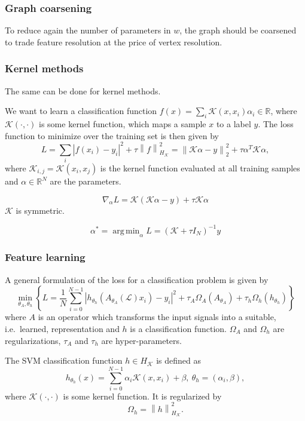 \documentclass{article}
\DeclareMathOperator*{\argmin}{arg\,min}
\renewcommand{\L}{\mathcal{L}}
\newcommand{\K}{\mathcal{K}}
\newcommand{\R}{\mathbb{R}}
\newcommand{\norm}[1]{\left\| #1 \right\|}
\begin{document}
\subsubsection{Graph coarsening}\label{graph-coarsening-1}

To reduce again the number of parameters in \(w\), the graph should be
coarsened to trade feature resolution at the price of vertex resolution.

\subsubsection{Kernel methods}\label{kernel-methods}

The same can be done for kernel methods.

We want to learn a classification function
\(f(x) = \sum_i \K(x,x_i) \alpha_i \in \R\), where \(\K(\cdot,\cdot)\)
is some kernel function, which maps a sample \(x\) to a label \(y\). The
loss function to minimize over the training set is then given by
\[ L = \sum_i |f(x_i) - y_i|^2 + \tau \norm{f}_{H_\K}^2 =
\norm{ \K \alpha - y }_2^2 + \tau \alpha^T \K \alpha, \] where
\(\K_{i,j} = \K(x_i, x_j)\) is the kernel function evaluated at all
training samples and \(\alpha \in \R^N\) are the parameters.

\[ \nabla_\alpha L = \K (\K \alpha - y) + \tau \K \alpha \] \(\K\) is
symmetric.

\[ \alpha^* = \argmin_\alpha L = (\K + \tau I_N)^{-1} y \]

\subsubsection{Feature learning}\label{feature-learning-1}

A general formulation of the loss for a classification problem is given
by \[ \min_{\theta_A, \theta_h} \left\{ L = \frac{1}{N} \sum_{i=0}^{N-1}
\left| h_{\theta_h}(A_{\theta_A}(\L) x_i) - y_i \right|^2 +
\tau_A \Omega_A(A_{\theta_A}) + \tau_h \Omega_h(h_{\theta_h}) \right\} \]
where \(A\) is an operator which transforms the input signals into a
suitable, i.e.~learned, representation and \(h\) is a classification
function. \(\Omega_A\) and \(\Omega_h\) are regularizations, \(\tau_A\)
and \(\tau_h\) are hyper-parameters.

The SVM classification function \(h \in H_\K\) is defined as
\[ h_{\theta_h}(x) = \sum_{i=0}^{N-1} \alpha_i \K(x, x_i) + \beta,
\ \theta_h = (\alpha_i, \beta), \] where \(\K(\cdot,\cdot)\) is some
kernel function. It is regularized by
\[ \Omega_h = \norm{h}_{H_\K}^2. \]
\end{document}
